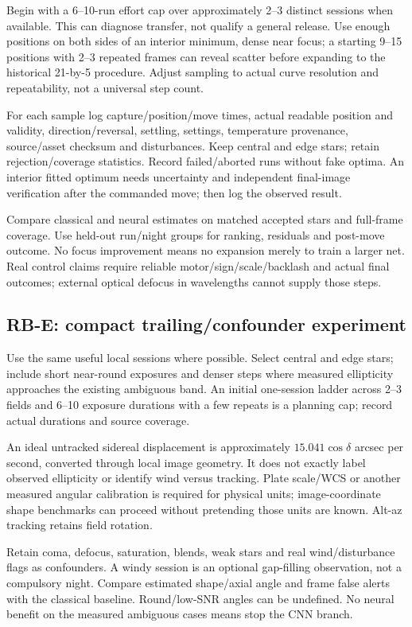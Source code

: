 \documentclass[11pt,a4paper]{article}
\begin{document}
Begin with a 6--10-run effort cap over approximately 2--3 distinct sessions
when available. This can diagnose transfer, not qualify a general release.
Use enough positions on both sides of an interior minimum, dense near focus;
a starting 9--15 positions with 2--3 repeated frames can reveal scatter before
expanding to the historical 21-by-5 procedure. Adjust sampling to actual curve
resolution and repeatability, not a universal step count.

For each sample log capture/position/move times, actual readable position and
validity, direction/reversal, settling, settings, temperature provenance,
source/asset checksum and disturbances. Keep central and edge stars; retain
rejection/coverage statistics. Record failed/aborted runs without fake optima.
An interior fitted optimum needs uncertainty and independent final-image
verification after the commanded move; then log the observed result.

Compare classical and neural estimates on matched accepted stars and full-frame
coverage. Use held-out run/night groups for ranking, residuals and post-move
outcome. No focus improvement means no expansion merely to train a larger net.
Real control claims require reliable motor/sign/scale/backlash and actual final
outcomes; external optical defocus in wavelengths cannot supply those steps.

\subsection{RB-E: compact trailing/confounder experiment}
Use the same useful local sessions where possible. Select central and edge
stars; include short near-round exposures and denser steps where measured
ellipticity approaches the existing ambiguous band. An initial one-session
ladder across 2--3 fields and 6--10 exposure durations with a few repeats is a
planning cap; record actual durations and source coverage.

An ideal untracked sidereal displacement is approximately
$15.041\cos\delta$ arcsec per second, converted through local image geometry.
It does not exactly label observed ellipticity or identify wind versus tracking.
Plate scale/WCS or another measured angular calibration is required for physical
units; image-coordinate shape benchmarks can proceed without pretending those
units are known. Alt-az tracking retains field rotation.

Retain coma, defocus, saturation, blends, weak stars and real wind/disturbance
flags as confounders. A windy session is an optional gap-filling observation,
not a compulsory night. Compare estimated shape/axial angle and frame false
alerts with the classical baseline. Round/low-SNR angles can be undefined. No
neural benefit on the measured ambiguous cases means stop the CNN branch.
\end{document}
